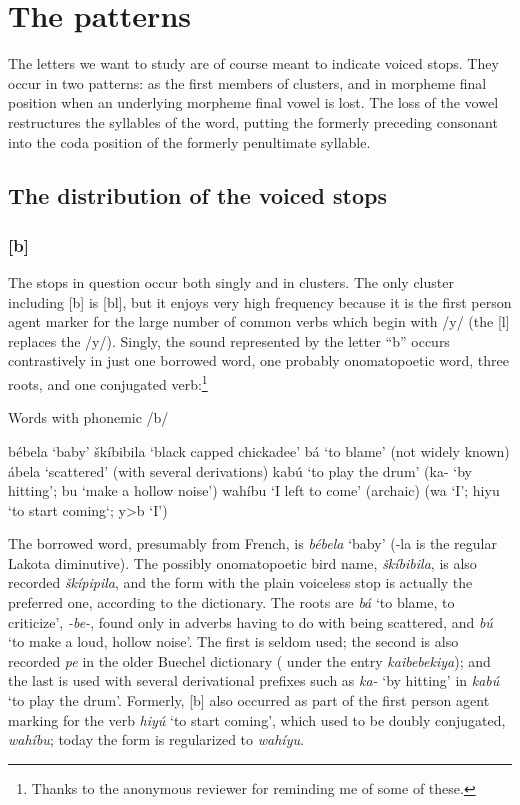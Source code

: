 \documentclass[output=paper]{LSP/langsci}
\begin{document}
\section{The patterns}

The letters we want to study are of course meant to indicate voiced stops. They occur in two patterns: as the first members of clusters, and in morpheme final position when an underlying morpheme final vowel is lost. The loss of the vowel restructures the syllables of the word, putting the formerly preceding consonant into the coda position of the formerly penultimate syllable.

\subsection{The distribution of the voiced stops}

\subsubsection{[b]}

The stops in question occur both singly and in clusters. The only cluster including [b] is [bl], but it enjoys very high frequency because it is the first person agent marker for the large number of common verbs which begin with /y/ (the [l] replaces the /y/). Singly, the sound represented by the letter ``b'' occurs contrastively in just one borrowed word, one probably onomatopoetic word, three roots, and one conjugated verb:\footnote{Thanks to the anonymous reviewer for reminding me of some of these.}

\begin{exe} \label{ex:rood:1}
\ex Words with phonemic /b/
\begin{xlist}
\ex b\'ebela `baby'
\ex \v{s}k\'ibibila `black capped chickadee'
\ex b\'a `to blame' (not widely known)
\ex \'abela `scattered' (with several derivations)
\ex kab\'u `to play the drum' (ka- `by hitting'; bu `make a hollow noise')
\ex wah\'ibu `I left to come' (archaic) (wa `I'; hiyu `to start coming`; y>b `I')
\end{xlist}
\end{exe}

The borrowed word, presumably from French, is \textit{b\'ebela} `baby' (-la is the regular Lakota diminutive). The possibly onomatopoetic bird name, \textit{\v{s}k\'ibibila}, is also recorded \textit{\v{s}k\'ipipila}, and the form with the plain voiceless stop is actually the preferred one, according to the dictionary. The roots are \textit{b\'a} `to blame, to criticize', \textit{-be-}, found only in adverbs having to do with being scattered, and \textit{b\'u} `to make a loud, hollow noise'. The first is seldom used; the second is also recorded \textit{pe} in the older Buechel dictionary (\citealt[278]{Buechel1970} under the entry \textit{kaibebekiya}); and the last is used with several derivational prefixes such as \textit{ka-} `by hitting' in \textit{kab\'u} `to play the drum'. Formerly, [b] also occurred as part of the first person agent marking for the verb \textit{hiy\'u} `to start coming', which used to be doubly conjugated, \textit{wah\'ibu}; today the form is regularized to \textit{wah\'iyu}.
\end{document}
